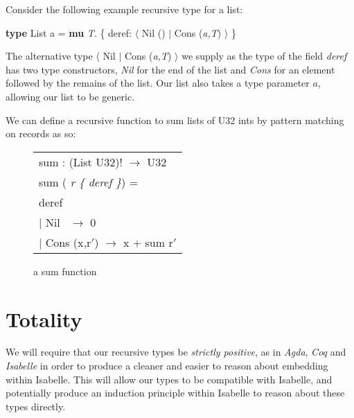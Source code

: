 Consider the following example recursive type for a list:
\begin{center}
    \textbf{type} List a = \textbf{mu} \textit{T}. \{ deref: $\langle$ Nil () $\vert$ Cons (\textit{a,T}) $\rangle$ \}
\end{center}

The alternative type {$\langle$ Nil $\vert$ Cons (\textit{a,T}) $\rangle$} we supply as the type of the field
\textit{deref} has two type constructors, \textit{Nil} for the end of the list and \textit{Cons} for an element
followed by the remains of the list. Our list also takes a type parameter $a$, allowing our list to be generic.

We can define a recursive function to sum lists of U32 ints by pattern matching on records as so:
\begin{figure}[!htbp]
    \begin{center}
        \begin{tabular}{l}
            sum : (List U32)! $\rightarrow$ U32 \\
            sum (\textit{ r \{ deref \}}) = \\
            \hspace{0.8em} deref \\
                \hspace{2em} $\vert$ Nil  \quad\quad\quad$\,$   $\rightarrow$ 0 \\
                \hspace{2em} $\vert$ Cons (x,r$'$)  $\rightarrow$ x + sum r$'$
        \end{tabular}
    \end{center}
    \caption[short]{a sum function}
    \label{fig:sum}
\end{figure}



\section{Totality}

We will require that our recursive types be \textit{strictly positive}, as in \textit{Agda},
\textit{Coq} and \textit{Isabelle} in order to produce a cleaner and easier to reason about
embedding within Isabelle. This will allow our types to be compatible with Isabelle, and potentially
produce an induction principle within Isabelle to reason about these types directly.

